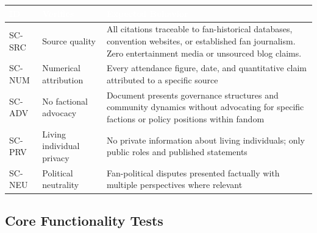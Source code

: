 \documentclass[11pt,letterpaper]{article}
\newcommand{\tableheader}[1]{\textbf{\sffamily\textcolor{white}{#1}}}
\begin{document}
\begin{center}
\begin{tabularx}{\textwidth}{C{1.2cm}L{3cm}X}
\toprule
{}
\tableheader{ID} & \tableheader{Verifies} & \tableheader{Expected Behavior} \\
\midrule
SC-SRC & Source quality & All citations traceable to fan-historical databases, convention websites, or established fan journalism. Zero entertainment media or unsourced blog claims. \\
SC-NUM & Numerical attribution & Every attendance figure, date, and quantitative claim attributed to a specific source \\
SC-ADV & No factional advocacy & Document presents governance structures and community dynamics without advocating for specific factions or policy positions within fandom \\
SC-PRV & Living individual privacy & No private information about living individuals; only public roles and published statements \\
SC-NEU & Political neutrality & Fan-political disputes presented factually with multiple perspectives where relevant \\
\bottomrule
\end{tabularx}
\end{center}

\subsection{Core Functionality Tests}
\end{document}
